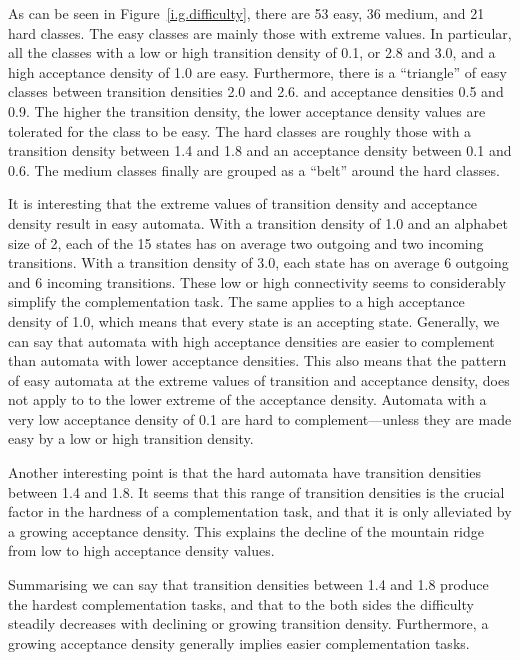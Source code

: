 As can be seen in Figure~\ref{i.g.difficulty}, there are 53 easy, 36 medium, and 21 hard classes. The easy classes are mainly those with extreme values. In particular, all the classes with a low or high transition density of 0.1, or 2.8 and 3.0, and a high acceptance density of 1.0 are easy. Furthermore, there is a ``triangle'' of easy classes between transition densities 2.0 and 2.6. and acceptance densities 0.5 and 0.9. The higher the transition density, the lower acceptance density values are tolerated for the class to be easy. The hard classes are roughly those with a transition density between 1.4 and 1.8 and an acceptance density between 0.1 and 0.6. The medium classes finally are grouped as a ``belt'' around the hard classes.

It is interesting that the extreme values of transition density and acceptance density result in easy automata. With a transition density of 1.0 and an alphabet size of 2, each of the 15 states has on average two outgoing and two incoming transitions. With a transition density of 3.0, each state has on average 6 outgoing and 6 incoming transitions. These low or high connectivity seems to considerably simplify the complementation task. The same applies to a high acceptance density of 1.0, which means that every state is an accepting state. Generally, we can say that automata with high acceptance densities are easier to complement than automata with lower acceptance densities. This also means that the pattern of easy automata at the extreme values of transition and acceptance density, does not apply to to the lower extreme of the acceptance density. Automata with a very low acceptance density of 0.1 are hard to complement---unless they are made easy by a low or high transition density.

Another interesting point is that the hard automata have transition densities between 1.4 and 1.8. It seems that this range of transition densities is the crucial factor in the hardness of a complementation task, and that it is only alleviated by a growing acceptance density. This explains the decline of the mountain ridge from low to high acceptance density values.

Summarising we can say that transition densities between 1.4 and 1.8 produce the hardest complementation tasks, and that to the both sides the difficulty steadily decreases with declining or growing transition density. Furthermore, a growing acceptance density generally implies easier complementation tasks.


